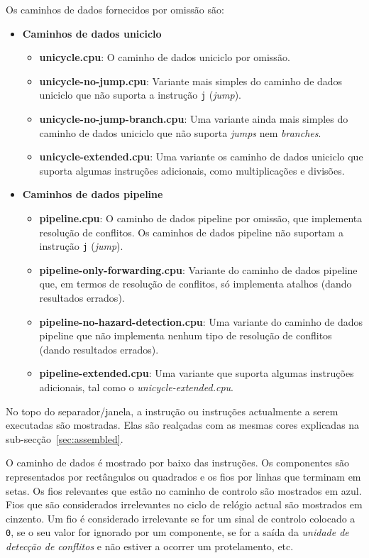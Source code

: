 \documentclass[11pt,a4paper,twoside,titlepage]{article}
\begin{document}
Os caminhos de dados fornecidos por omissão são:
\begin{itemize}
	\item \textbf{Caminhos de dados uniciclo}
	\begin{itemize}
		\item \textbf{unicycle.cpu}: O caminho de dados uniciclo por omissão.
		\item \textbf{unicycle-no-jump.cpu}: Variante mais simples do caminho
			de dados uniciclo que não suporta a instrução \verb+j+
			(\emph{jump}).
		\item \textbf{unicycle-no-jump-branch.cpu}: Uma variante ainda mais
			simples do caminho de dados uniciclo que não suporta \emph{jumps}
			nem \emph{branches}.
		\item \textbf{unicycle-extended.cpu}: Uma variante os caminho de dados
			uniciclo que suporta algumas instruções adicionais, como
			multiplicações e divisões.
	\end{itemize}
	
	\item \textbf{Caminhos de dados pipeline}
	\begin{itemize}
		\item \textbf{pipeline.cpu}: O caminho de dados pipeline por omissão,
			que implementa resolução de conflitos. Os caminhos de dados 
			pipeline não suportam a instrução \verb+j+ (\emph{jump}).
		\item \textbf{pipeline-only-forwarding.cpu}: Variante do caminho de 
			dados pipeline que, em termos de resolução de conflitos, só
			implementa atalhos (dando resultados errados).
		\item \textbf{pipeline-no-hazard-detection.cpu}: Uma variante do
			caminho de dados pipeline que não implementa nenhum tipo de
			resolução de conflitos (dando resultados errados).
		\item \textbf{pipeline-extended.cpu}: Uma variante que suporta algumas
			instruções adicionais, tal como o \emph{unicycle-extended.cpu}.
	\end{itemize}
\end{itemize}

No topo do separador/janela, a instrução ou instruções actualmente a serem
executadas são mostradas. Elas são realçadas com as mesmas cores explicadas
na sub-secção~\ref{sec:assembled}.

O caminho de dados é mostrado por baixo das instruções.
Os componentes são representados por rectângulos ou quadrados e os fios por
linhas que terminam em setas.
Os fios relevantes que estão no caminho de controlo são mostrados em azul.
Fios que são considerados irrelevantes no ciclo de relógio actual são 
mostrados em cinzento.
Um fio é considerado irrelevante se for um sinal de controlo colocado a
\verb+0+, se o seu valor for ignorado por um componente, se for a saída da
\emph{unidade de detecção de conflitos} e não estiver a ocorrer um
protelamento, etc.
\end{document}
